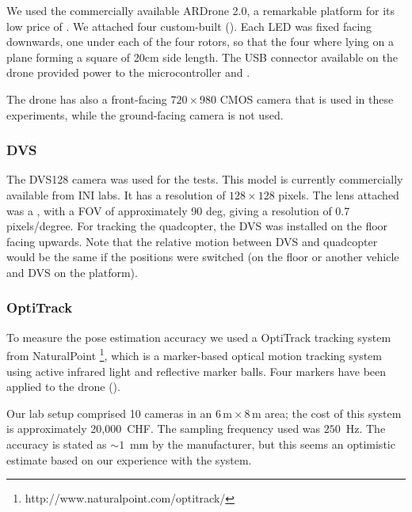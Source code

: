 We used the commercially available ARDrone 2.0, a remarkable platform
for its low price of \xxx. We attached four custom-built \ALMs ().
Each LED was fixed facing downwards, one under each of the four rotors,
so that the four where lying on a plane forming a square of 20cm side
length. The USB connector available on the drone provided power to
the microcontroller and \ALMs.

The drone has also a front-facing $720\times980$ CMOS camera that
is used in these experiments, while the ground-facing camera is not
used.


\subsubsection{DVS }

The DVS128 camera was used for the tests. This model is currently
commercially available from INI labs. It has a resolution of $128\times128$
pixels. The lens attached was a \xxx, with a FOV of approximately
90 deg, giving a resolution of 0.7 pixels/degree. For tracking the
quadcopter, the DVS was installed on the floor facing upwards. Note
that the relative motion between DVS and quadcopter would be the same
if the positions were switched (\ALMs on the floor or another vehicle
and DVS on the platform).


\subsubsection{OptiTrack}

To measure the pose estimation accuracy we used a OptiTrack tracking
system from NaturalPoint%
\footnote{http://www.naturalpoint.com/optitrack/%
}, which is a marker-based optical motion tracking system using active
infrared light and reflective marker balls. Four markers have been
applied to the drone (). 

Our lab setup comprised 10 cameras in an $6\,\mbox{m}\times8\,\mbox{m}$
area; the cost of this system is approximately 20,000~CHF. The sampling
frequency used was $250$~Hz. The accuracy is stated as $\sim1$~mm
by the manufacturer, but this seems an optimistic estimate based on
our experience with the system.



